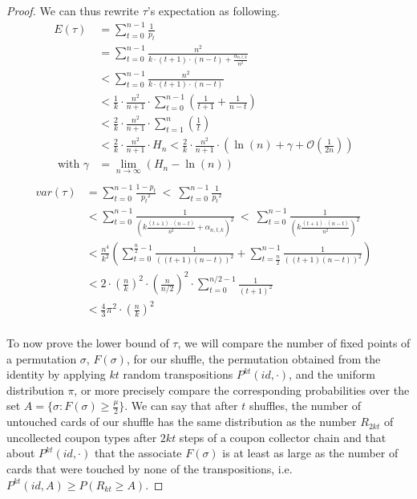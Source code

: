 \documentclass[conference]{IEEEtran}
\begin{document}
\begin{proof}
We can thus rewrite $\tau$'s expectation as following.
\begin{align*}
 E(\tau) &= \sum_{t=0}^{n-1} \frac{1}{p_{t}} &\\
 &= \sum_{t=0}^{n-1} \frac{n^2}{k \cdot (t+1)\cdot(n-t) + \frac{\alpha_{n,t,k}}{n^2}}&\\
 &< \sum_{t=0}^{n-1} \frac{n^2}{k \cdot (t+1)\cdot(n-t)}  &\\
 &< \frac{1}{k} \cdot \frac{n^2}{n+1} \cdot  \sum_{t=0}^{n-1} \left ( \frac{1}{t+1} + \frac{1}{n-t} \right ) &\\
 &< \frac{2}{k} \cdot \frac{n^2}{n+1} \cdot \sum_{t=1}^{n} \left ( \frac{1}{t} \right ) &\\
 &< \frac{2}{k} \cdot \frac{n^2}{n+1} \cdot H_n  < \frac{2}{k} \cdot \frac{n^2}{n+1} \cdot \left( \ln(n) + \gamma +\mathcal{O}(\frac{1}{2n}) \right )&\\
 \text{ with } \gamma &= \lim_{n \to \infty} \left ( H_n - \ln(n) \right ) & \\
 \end{align*}
 \begin{align*}
 var(\tau) &= \sum_{t=0}^{n-1}\frac{1-p_t}{{p_t}^2}\ <\  \sum_{t=0}^{n-1}\frac{1}{{p_t}^2} &\\
 &< \sum_{t=0}^{n-1}\frac{1}{\left ( k \frac{(t+1)\cdot(n-t)}{n^2} + \alpha_{n,t,k}\right )^2}\ <\ \sum_{t=0}^{n-1} \frac{1 }{\left ( k \frac{(t+1)\cdot(n-t)}{n^2} \right )^2} &\\
 &< \frac{n^4}{k^2} \left ( \sum_{t=0}^{\frac{n}{2}-1} \frac{1}{\left ( (t+1)(n-t)\right )^2}  + \sum_{t=\frac{n}{2}}^{n-1} \frac{1}{\left ( (t+1)(n-t)\right )^2} \right ) &\\
 &< 2 \cdot \left (\frac{n}{k} \right )^2 \cdot \left (\frac{n}{n/2} \right )^2 \cdot \sum_{t=0}^{n/2-1} \frac{1}{(t+1)^2} &\\
 &< \frac{4}{3} \pi^2 \cdot \left (\frac{n}{k} \right )^2 
\end{align*}
\\

To now prove the lower bound of $\tau$, we will compare the number of fixed points of a permutation $\sigma$, $F(\sigma)$, for our shuffle, the permutation
obtained from the identity by applying $kt$ random transpositions $ P^{kt}(id, \cdot)$, and the uniform distribution $\pi$, or more precisely compare the corresponding probabilities over the set $A=\{\sigma : F(\sigma) \geq \frac{\mu}{2} \}$.
We can say that after $t$ shuffles, the number of untouched cards of our shuffle has the same distribution as the number $R_{2kt}$ of uncollected coupon types after $2kt$ steps of a coupon collector chain
and that about $ P^{kt}(id, \cdot)$ that the associate $F(\sigma)$ is at least as large as the number of cards that were touched by none of the transpositions, i.e. $P^{kt}(id,A) \geq P(R_{kt}\geq A) $.


\end{proof}
\end{document}

